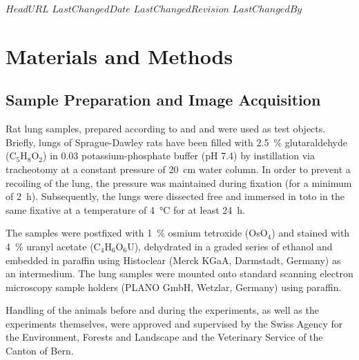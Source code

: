 \svnidlong
{$HeadURL$}
{$LastChangedDate$}
{$LastChangedRevision$}
{$LastChangedBy$}

\ifhtml
\else
\begin{center}
\end{center}
\fi

\section{Materials and Methods}%
\label{sec:materials and methods}%
\subsection{Sample Preparation and Image Acquisition}%
Rat lung samples, prepared according to %
\ifhtml
	\citet{Tschanz2002} and \citet{Luyet2002}
\else
	 and 
\fi%
were used as test objects. Briefly, lungs of Sprague-Dawley rats have been filled with \SI{2.5}{\percent} glutaraldehyde (C$_5$H$_8$O$_2$) in \SI{0.03}{\Molar} potassium-phosphate buffer (pH 7.4) by instillation via tracheotomy at a constant pressure of \SI{20}{\centi\meter} water column. In order to prevent a recoiling of the lung, the pressure was maintained during fixation (for a minimum of \SI{2}{\hour}). Subsequently, the lungs were dissected free and immersed in toto in the same fixative at a temperature of \SI{4}{\celsius} for at least \SI{24}{\hour}.

The samples were postfixed with \SI{1}{\percent} osmium tetroxide (OsO$_4$) and stained with \SI{4}{\percent} uranyl acetate (C$_4$H$_6$O$_6$U), dehydrated in a graded series of ethanol and embedded in paraffin using Histoclear (Merck KGaA, Darmstadt, Germany) as an intermedium. The lung samples were mounted onto standard scanning electron microscopy sample holders (PLANO GmbH, Wetzlar, Germany) using paraffin.

Handling of the animals before and during the experiments, as well as the experiments themselves, were approved and supervised by the Swiss Agency for the Environment, Forests and Landscape and the Veterinary Service of the Canton of Bern.

